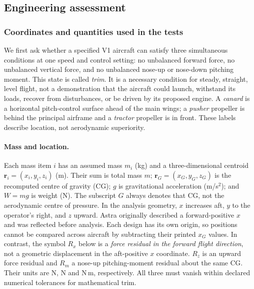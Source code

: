 \documentclass[11pt,a4paper]{article}
\begin{document}
\subsection{Engineering assessment}
\subsubsection{Coordinates and quantities used in the tests}
We first ask whether a specified V1 aircraft can satisfy three simultaneous conditions at one speed and control setting: no unbalanced forward force, no unbalanced vertical force, and no unbalanced nose-up or nose-down pitching moment. This state is called \emph{trim}. It is a necessary condition for steady, straight, level flight, not a demonstration that the aircraft could launch, withstand its loads, recover from disturbances, or be driven by its proposed engine. A \emph{canard} is a horizontal pitch-control surface ahead of the main wings; a \emph{pusher} propeller is behind the principal airframe and a \emph{tractor} propeller is in front. These labels describe location, not aerodynamic superiority.

\paragraph{Mass and location.} Each mass item $i$ has an assumed mass $m_i$ (kg) and a three-dimensional centroid $\boldsymbol r_i=(x_i,y_i,z_i)$ (m). Their sum is total mass $m$; $\boldsymbol r_G=(x_G,y_G,z_G)$ is the recomputed centre of gravity (CG); $g$ is gravitational acceleration (m/s$^2$); and $W=mg$ is weight (N). The subscript $G$ always denotes that CG, not the aerodynamic centre of pressure. In the analysis geometry, $x$ increases aft, $y$ to the operator's right, and $z$ upward. Astra originally described a forward-positive $x$ and was reflected before analysis. Each design has its own origin, so positions cannot be compared across aircraft by subtracting their printed $x_G$ values. In contrast, the symbol $R_x$ below is a \emph{force residual in the forward flight direction}, not a geometric displacement in the aft-positive $x$ coordinate. $R_z$ is an upward force residual and $R_m$ a nose-up pitching-moment residual about the same CG. Their units are N, N and N\,m, respectively. All three must vanish within declared numerical tolerances for mathematical trim.
\end{document}
